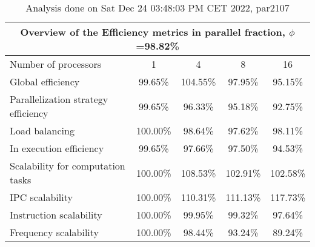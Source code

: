 \begin{table}[h]
\begin{center}
\begin{tabular}{|l|c|c|c|c|}
\hline
\multicolumn{5}{|c|}{Overview of the Efficiency metrics in parallel fraction, $\phi$=98.82\%} \\
\hline
\hline
Number of processors & 1 & 4 & 8 & 16 \\
\hline
\hline
Global efficiency                      &     99.65\% &    104.55\% &     97.95\% &     95.15\% \\
\hline
\hline
Parallelization strategy efficiency &     99.65\% &     96.33\% &     95.18\% &     92.75\% \\
\hline
Load balancing                   &    100.00\% &     98.64\% &     97.62\% &     98.11\% \\
In execution efficiency          &     99.65\% &     97.66\% &     97.50\% &     94.53\% \\
\hline
\hline
Scalability for computation tasks   &    100.00\% &    108.53\% &    102.91\% &    102.58\% \\
\hline
IPC scalability                  &    100.00\% &    110.31\% &    111.13\% &    117.73\% \\
Instruction scalability          &    100.00\% &     99.95\% &     99.32\% &     97.64\% \\
Frequency scalability            &    100.00\% &     98.44\% &     93.24\% &     89.24\% \\
\hline
\end{tabular}
\end{center}
\caption{ Analysis done on Sat Dec 24 03:48:03 PM CET 2022, par2107}
\end{table}
